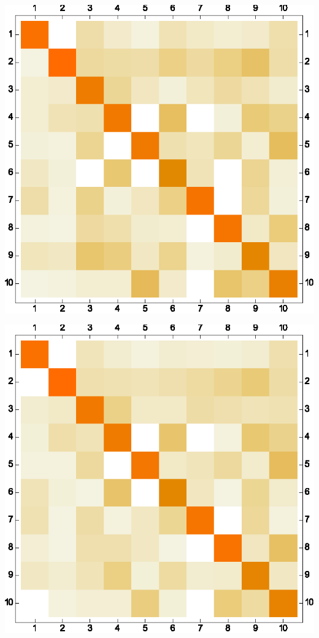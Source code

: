 \documentclass[letter]{article}
\begin{document}
\includegraphics{GRAPHS_gr5.eps}

\includegraphics{GRAPHS_gr6.eps}
\end{document}
